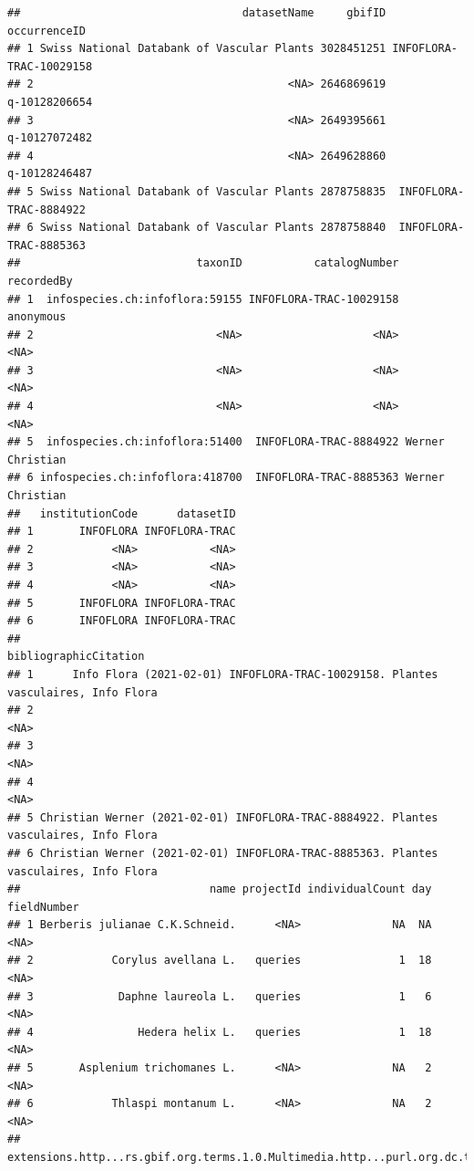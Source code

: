 \documentclass[
]{book}
\begin{document}
\begin{verbatim}
##                                  datasetName     gbifID            occurrenceID
## 1 Swiss National Databank of Vascular Plants 3028451251 INFOFLORA-TRAC-10029158
## 2                                       <NA> 2646869619           q-10128206654
## 3                                       <NA> 2649395661           q-10127072482
## 4                                       <NA> 2649628860           q-10128246487
## 5 Swiss National Databank of Vascular Plants 2878758835  INFOFLORA-TRAC-8884922
## 6 Swiss National Databank of Vascular Plants 2878758840  INFOFLORA-TRAC-8885363
##                           taxonID           catalogNumber       recordedBy
## 1  infospecies.ch:infoflora:59155 INFOFLORA-TRAC-10029158        anonymous
## 2                            <NA>                    <NA>             <NA>
## 3                            <NA>                    <NA>             <NA>
## 4                            <NA>                    <NA>             <NA>
## 5  infospecies.ch:infoflora:51400  INFOFLORA-TRAC-8884922 Werner Christian
## 6 infospecies.ch:infoflora:418700  INFOFLORA-TRAC-8885363 Werner Christian
##   institutionCode      datasetID
## 1       INFOFLORA INFOFLORA-TRAC
## 2            <NA>           <NA>
## 3            <NA>           <NA>
## 4            <NA>           <NA>
## 5       INFOFLORA INFOFLORA-TRAC
## 6       INFOFLORA INFOFLORA-TRAC
##                                                                   bibliographicCitation
## 1      Info Flora (2021-02-01) INFOFLORA-TRAC-10029158. Plantes vasculaires, Info Flora
## 2                                                                                  <NA>
## 3                                                                                  <NA>
## 4                                                                                  <NA>
## 5 Christian Werner (2021-02-01) INFOFLORA-TRAC-8884922. Plantes vasculaires, Info Flora
## 6 Christian Werner (2021-02-01) INFOFLORA-TRAC-8885363. Plantes vasculaires, Info Flora
##                             name projectId individualCount day fieldNumber
## 1 Berberis julianae C.K.Schneid.      <NA>              NA  NA        <NA>
## 2            Corylus avellana L.   queries               1  18        <NA>
## 3             Daphne laureola L.   queries               1   6        <NA>
## 4                Hedera helix L.   queries               1  18        <NA>
## 5       Asplenium trichomanes L.      <NA>              NA   2        <NA>
## 6            Thlaspi montanum L.      <NA>              NA   2        <NA>
##   extensions.http...rs.gbif.org.terms.1.0.Multimedia.http...purl.org.dc.terms.rightsHolder

\end{verbatim}
\end{document}
